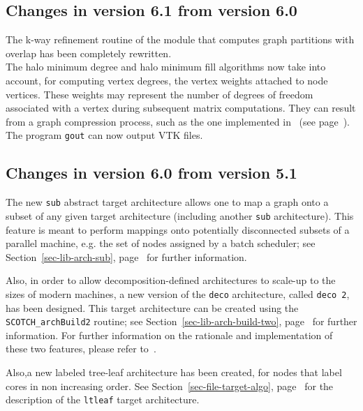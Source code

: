 \subsection{Changes in version 6.1 from version 6.0}

The k-way refinement routine of the module that computes graph
partitions with overlap has been completely rewritten.
\\

The halo minimum degree and halo minimum fill algorithms now take into
account, for computing vertex degrees, the vertex weights attached to
node vertices. These weights may represent the number of degrees of
freedom associated with a vertex during subsequent matrix
computations. They can result from a graph compression process, such
as the one implemented in \scotch\ (see
page~\pageref{sec-lib-meth-compress}).
\\

The program \texttt{gout} can now output VTK files.

\subsection{Changes in version 6.0 from version 5.1}

The new \texttt{sub} abstract target architecture allows one to map a
graph onto a subset of any given target architecture (including
another \texttt{sub} architecture). This feature is meant to perform
mappings onto potentially disconnected subsets of a parallel machine,
e.g. the set of nodes assigned by a batch scheduler; see
Section~\ref{sec-lib-arch-sub}, page~\pageref{sec-lib-arch-sub} for
further information.

Also, in order to allow decomposition-defined architectures to
scale-up to the sizes of modern machines, a new version of the
\texttt{deco} architecture, called \texttt{deco~2}, has been
designed. This target architecture can be created using the
\texttt{SCOTCH\_\lbt arch\lbt Build2} routine; see
Section~\ref{sec-lib-arch-build-two},
page~\pageref{sec-lib-arch-build-two} for further information.
For further information on the rationale and implementation of these
two features, please refer to~\cite{pellegrini:hal-01671156}.

Also,a new labeled tree-leaf architecture has been created, for nodes
that label cores in non increasing order. See
Section~\ref{sec-file-target-algo},
page~\pageref{sec-file-target-algo} for the description of the
\texttt{ltleaf} target architecture.
\\


